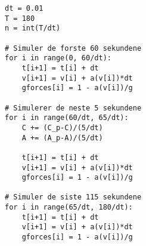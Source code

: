 \documentclass[a4paper, 11pt, notitlepage]{article}
\begin{document}
\begin{lstlisting}
dt = 0.01
T = 180
n = int(T/dt)

# Simuler de forste 60 sekundene
for i in range(0, 60/dt):
    t[i+1] = t[i] + dt
    v[i+1] = v[i] + a(v[i])*dt
    gforces[i] = 1 - a(v[i])/g

# Simulerer de neste 5 sekundene
for i in range(60/dt, 65/dt):
    C += (C_p-C)/(5/dt)
    A += (A_p-A)/(5/dt)

    t[i+1] = t[i] + dt
    v[i+1] = v[i] + a(v[i])*dt
    gforces[i] = 1 - a(v[i])/g

# Simuler de siste 115 sekundene
for i in range(65/dt, 180/dt):
    t[i+1] = t[i] + dt
    v[i+1] = v[i] + a(v[i])*dt
    gforces[i] = 1 - a(v[i])/g
\end{lstlisting}
\end{document}
